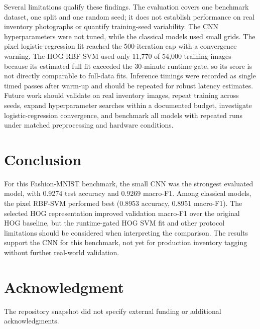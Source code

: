 \documentclass[conference]{IEEEtran}
\begin{document}
Several limitations qualify these findings. The evaluation covers one benchmark dataset, one split and one random seed; it does not establish performance on real inventory photographs or quantify training-seed variability. The CNN hyperparameters were not tuned, while the classical models used small grids. The pixel logistic-regression fit reached the 500-iteration cap with a convergence warning. The HOG RBF-SVM used only 11,770 of 54,000 training images because its estimated full fit exceeded the 30-minute runtime gate, so its score is not directly comparable to full-data fits. Inference timings were recorded as single timed passes after warm-up and should be repeated for robust latency estimates. Future work should validate on real inventory images, repeat training across seeds, expand hyperparameter searches within a documented budget, investigate logistic-regression convergence, and benchmark all models with repeated runs under matched preprocessing and hardware conditions.

\section{Conclusion}
\label{sec:conclusion}
For this Fashion-MNIST benchmark, the small CNN was the strongest evaluated model, with 0.9274 test accuracy and 0.9269 macro-F1. Among classical models, the pixel RBF-SVM performed best (0.8953 accuracy, 0.8951 macro-F1). The selected HOG representation improved validation macro-F1 over the original HOG baseline, but the runtime-gated HOG SVM fit and other protocol limitations should be considered when interpreting the comparison. The results support the CNN for this benchmark, not yet for production inventory tagging without further real-world validation.

\section*{Acknowledgment}
The repository snapshot did not specify external funding or additional acknowledgments.



\end{document}

